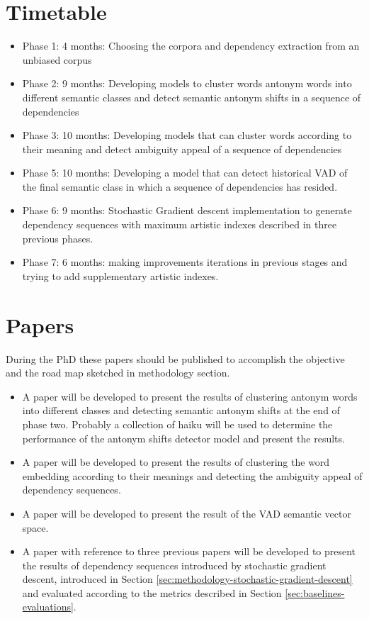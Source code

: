 \documentclass{article}
\begin{document}
	\section{Timetable}
	\begin{itemize}
		\item Phase 1: 4 months: Choosing the corpora and dependency extraction from an unbiased corpus	
		\item Phase 2: 9 months: Developing models to cluster words antonym words into different semantic classes and detect semantic antonym shifts in a sequence of dependencies
		\item Phase 3: 10 months: Developing models that can cluster words according to their meaning and detect ambiguity appeal of a sequence of dependencies
		\item Phase 5: 10 months: Developing a model that can detect historical VAD of the final semantic class in which a sequence of dependencies has resided. 
		\item Phase 6: 9 months: Stochastic Gradient descent implementation to generate dependency sequences with maximum artistic indexes described in three previous phases. 
		\item Phase 7: 6 months: making improvements iterations in previous stages and trying to add supplementary artistic indexes. 
	\end{itemize}
	\section{Papers}
	During the PhD these papers should be published to accomplish the objective and the road map sketched in methodology section. 
	\begin{itemize} 
		\item A paper will be developed to present the results of clustering antonym words into different classes and detecting semantic antonym shifts at the end of phase two. Probably a collection of haiku will be used to determine the performance of the antonym shifts detector model and present the results. 
		\item A paper will be developed to present the results of clustering the word embedding according to their meanings and detecting the ambiguity appeal of dependency sequences. 
		\item A paper will be developed to present the result of the VAD semantic vector space. 
		\item A paper with reference to three previous papers will be developed to present the results of dependency sequences introduced by stochastic gradient descent, introduced in Section \ref{sec:methodology-stochastic-gradient-descent} and evaluated according to the metrics described in Section \ref{sec:baselines-evaluations}.
	\end{itemize}
	
\end{document}
